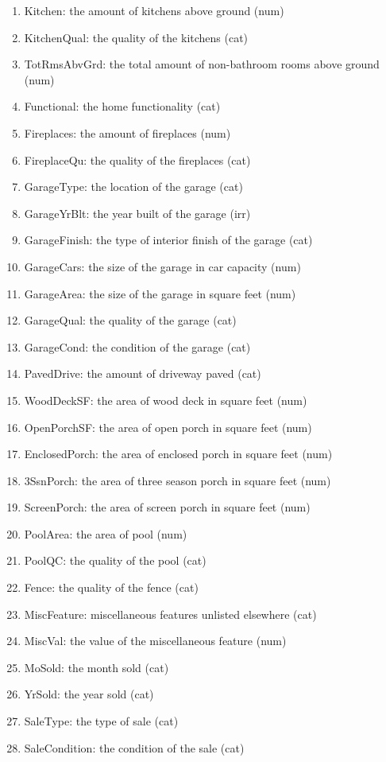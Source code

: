 \documentclass[12pt]{article}
\begin{document}
\begin{enumerate}
\item Kitchen: the amount of kitchens above ground (num)
\item KitchenQual: the quality of the kitchens (cat)
\item TotRmsAbvGrd: the total amount of non-bathroom rooms above ground (num)
\item Functional: the home functionality (cat)
\item Fireplaces: the amount of fireplaces (num)
\item FireplaceQu: the quality of the fireplaces (cat)
\item GarageType: the location of the garage (cat)
\item GarageYrBlt: the year built of the garage (irr)
\item GarageFinish: the type of interior finish of the garage (cat)
\item GarageCars: the size of the garage in car capacity (num)
\item GarageArea: the size of the garage in square feet (num)
\item GarageQual: the quality of the garage (cat)
\item GarageCond: the condition of the garage (cat)
\item PavedDrive: the amount of driveway paved (cat)
\item WoodDeckSF: the area of wood deck in square feet (num)
\item OpenPorchSF: the area of open porch in square feet (num)
\item EnclosedPorch: the area of enclosed porch in square feet (num)
\item 3SsnPorch: the area of three season porch in square feet (num)
\item ScreenPorch: the area of screen porch in square feet (num)
\item PoolArea: the area of pool (num)
\item PoolQC: the quality of the pool (cat)
\item Fence: the quality of the fence (cat)
\item MiscFeature: miscellaneous features unlisted elsewhere (cat)
\item MiscVal: the value of the miscellaneous feature (num)
\item MoSold: the month sold (cat)
\item YrSold: the year sold (cat)
\item SaleType: the type of sale (cat)
\item SaleCondition: the condition of the sale (cat)
\end{enumerate}
\end{document}
